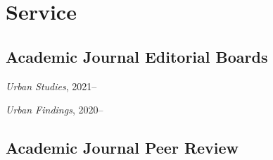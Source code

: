 \documentclass[12pt,letterpaper]{report}
\newcommand{\listitemspace}{0.25em}
\renewenvironment{itemize}
{\begin{list}{}{\setlength{\leftmargin}{0em}
                \setlength{\parskip}{0em}
                \setlength{\itemsep}{\listitemspace}
                \setlength{\parsep}{\listitemspace}}}
{\end{list}}
\begin{document}
    \section*{Service}

    \subsection*{Academic Journal Editorial Boards}

    \begin{itemize}

        \item \textit{Urban Studies}, 2021--
        \item \textit{Urban Findings}, 2020--

    \end{itemize}

    \subsection*{Academic Journal Peer Review}
\end{document}

